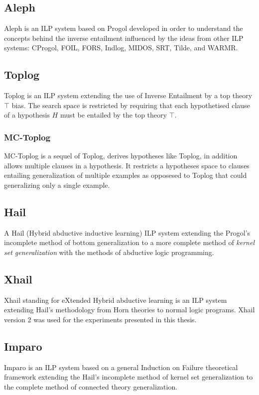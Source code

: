\subsection{Aleph\cite{aleph2007}}
Aleph is an ILP system based on Progol developed in order to understand the concepts behind the inverse entailment\cite{muggleton1995inverse} influenced by the ideas from other ILP systems: CProgol, FOIL, FORS, Indlog, MIDOS, SRT, Tilde, and WARMR. 

\subsection{Toplog\cite{santos2008toplogWebsite}\cite{muggleton2008toplog}}
Toplog is an ILP system extending the use of Inverse Entailment by a top theory $\top$ bias.
The search space is restricted by requiring that each hypothetised clause of a hypothesis $H$ must be entailed by the top theory $\top$.

\subsubsection{MC-Toplog\cite{muggleton2012mc}}
MC-Toplog is a sequel of Toplog, derives hypotheses like Toplog, in addition allows multiple clauses in a hypothesis. It restricts a hypotheses space to clauses entailing generalization of multiple examples as opposesed to Toplog that could generalizing only a single example.

\subsection{Hail\cite{ray2003hybrid}\cite{ray2005phdHybrid}}
A Hail (Hybrid abductive inductive learning) ILP system extending the Progol's incomplete method of bottom generalization to a more complete method of \emph{kernel set generalization} with the methods of abductive logic programming.

\subsection{Xhail\cite{ray2009nonmonotonic}}
Xhail standing for eXtended Hybrid abductive learning is an ILP system extending Hail's methodology from Horn theories to normal logic programs.
Xhail version 2 was used for the experiments presented in this thesis.

\subsection{Imparo\cite{kimber2012learning}}
Imparo is an ILP system based on a general Induction on Failure theoretical framework extending the Hail's incomplete method of kernel set generalization to the complete method of connected theory generalization.

